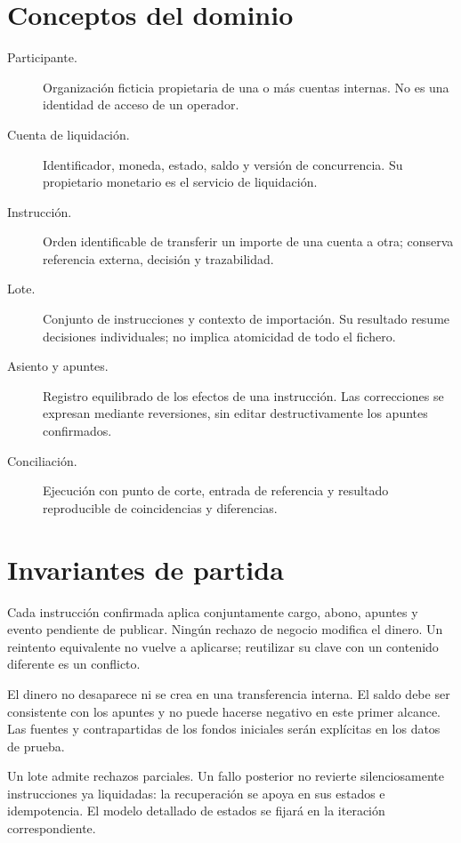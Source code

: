 \section{Conceptos del dominio}
\begin{description}
\item[Participante.] Organización ficticia propietaria de una o más cuentas internas. No es una identidad de acceso de un operador.
\item[Cuenta de liquidación.] Identificador, moneda, estado, saldo y versión de concurrencia. Su propietario monetario es el servicio de liquidación.
\item[Instrucción.] Orden identificable de transferir un importe de una cuenta a otra; conserva referencia externa, decisión y trazabilidad.
\item[Lote.] Conjunto de instrucciones y contexto de importación. Su resultado resume decisiones individuales; no implica atomicidad de todo el fichero.
\item[Asiento y apuntes.] Registro equilibrado de los efectos de una instrucción. Las correcciones se expresan mediante reversiones, sin editar destructivamente los apuntes confirmados.
\item[Conciliación.] Ejecución con punto de corte, entrada de referencia y resultado reproducible de coincidencias y diferencias.
\end{description}

\section{Invariantes de partida}
Cada instrucción confirmada aplica conjuntamente cargo, abono, apuntes y evento pendiente de publicar. Ningún rechazo de negocio modifica el dinero. Un reintento equivalente no vuelve a aplicarse; reutilizar su clave con un contenido diferente es un conflicto.

El dinero no desaparece ni se crea en una transferencia interna. El saldo debe ser consistente con los apuntes y no puede hacerse negativo en este primer alcance. Las fuentes y contrapartidas de los fondos iniciales serán explícitas en los datos de prueba.

Un lote admite rechazos parciales. Un fallo posterior no revierte silenciosamente instrucciones ya liquidadas: la recuperación se apoya en sus estados e idempotencia. El modelo detallado de estados se fijará en la iteración correspondiente.
